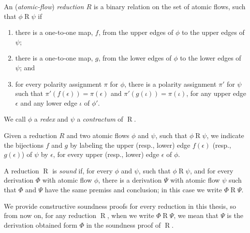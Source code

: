 \begin{definition}\label{definition:FlowReduction}
An (\emph{atomic-flow}) \emph{reduction $R$} is a binary relation on the set of atomic flows, such that $\phi\mathrel{R}\psi$ if
\begin{enumerate}
\item
there is a one-to-one map, $f$, from the upper edges of $\phi$ to the upper edges of $\psi$;
\item
there is a one-to-one map, $g$, from the lower edges of $\phi$ to the lower edges of $\psi$; and
\item\label{definition:FlowReduction:item:Polarity}
for every polarity assignment $\pi$ for $\phi$, there is a polarity assignment $\pi'$ for $\psi$ such that $\pi'(f(\epsilon))=\pi(\epsilon)$ and $\pi'(g(\iota))=\pi(\iota)$, for any upper edge $\epsilon$ and any lower edge $\iota$ of $\phi'$.
\end{enumerate}
We call $\phi$ a \emph{redex} and $\psi$ a \emph{contractum} of $\mathrel R$.
\end{definition}

\begin{remark}\label{remark:LabelBijectionEdges}
Given a reduction $R$ and two atomic flows $\phi$ and $\psi$, such that $\phi\mathrel{R}\psi$, we indicate the bijections $f$ and $g$ by labeling the upper (resp., lower) edge $f(\epsilon)$ (resp., $g(\epsilon)$) of $\psi$ by $\epsilon$, for every upper (resp., lower) edge $\epsilon$ of $\phi$.
\end{remark}


\begin{definition}\label{definition:SoundRedcution}
A reduction $\mathrel{R}$ is \emph{sound} if, for every $\phi$ and $\psi$, such that $\phi\mathrel{R}\psi$, and for every derivation $\Phi$ with atomic flow $\phi$, there is a derivation $\Psi$ with atomic flow $\psi$ such that $\Phi$ and $\Psi$ have the same premiss and conclusion; in this case we write $\Phi\mathrel{R}\Psi$.
\end{definition}

\begin{convention}
We provide constructive soundness proofs for every reduction in this thesis, so from now on, for any reduction $\mathrel{R}$, when we write $\Phi\mathrel{R}\Psi$, we mean that $\Psi$ is the derivation obtained form $\Phi$ in the soundness proof of $\mathrel{R}$.
\end{convention}

